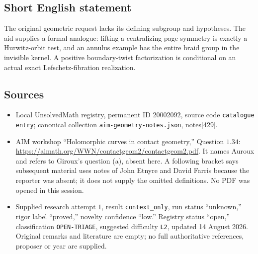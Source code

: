 \documentclass[11pt]{article}
\begin{document}
\subsection{Short English statement}
The original geometric request lacks its defining subgroup and hypotheses. The aid supplies a formal analogue: lifting a centralizing page symmetry is exactly a Hurwitz-orbit test, and an annulus example has the entire braid group in the invisible kernel. A positive boundary-twist factorization is conditional on an actual exact Lefschetz-fibration realization.
\subsection{Sources}
\begin{itemize}
\item Local UnsolvedMath registry, permanent ID \(20002092\), source code \texttt{catalogue entry}; canonical collection \texttt{aim-geometry-notes.json}, notes[429].
\item AIM workshop ``Holomorphic curves in contact geometry,'' Question \(1.34\): \url{https://aimath.org/WWN/contactgeom2/contactgeom2.pdf}. It names Auroux and refers to Giroux's question (a), absent here. A following bracket says subsequent material uses notes of John Etnyre and David Farris because the reporter was absent; it does not supply the omitted definitions. No PDF was opened in this session.
\item Supplied research attempt \(1\), result \texttt{context\_only}, run status ``unknown,'' rigor label ``proved,'' novelty confidence ``low.'' Registry status ``open,'' classification \texttt{OPEN-TRIAGE}, suggested difficulty \texttt{L2}, updated 14 August 2026. Original remarks and literature are empty; no full authoritative references, proposer or year are supplied.
\end{itemize}
\end{document}
